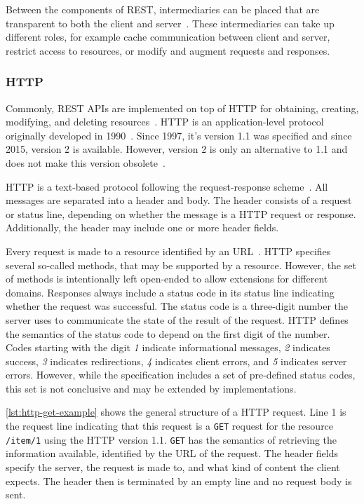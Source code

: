 Between the components of \ac{REST}, intermediaries can be placed that are transparent to both the client and server~\cite{Fielding2000}.
These intermediaries can take up different roles, for example cache communication between client and server, restrict access to resources, or modify and augment requests and responses.

\subsubsection{\acf{HTTP}}\label{sec:foundations:http}

Commonly, \ac{REST} \acp{API} are implemented on top of \ac{HTTP} for obtaining, creating, modifying, and deleting resources~\cite{Schermann2015}.
\ac{HTTP} is an application-level protocol originally developed in 1990~\cite{RFC2068}.
Since 1997, it's version 1.1 was specified and since 2015, version 2 is available.
However, version 2 is only an alternative to 1.1 and does not make this version obsolete~\cite{RFC7540}.

\ac{HTTP} is a text-based protocol following the request-response scheme~\cite{RFC2068}.
All messages are separated into a header and body.
The header consists of a request or status line, depending on whether the message is a \ac{HTTP} request or response.
Additionally, the header may include one or more header fields.

Every request is made to a resource identified by an \ac{URL}~\cite{RFC2068}.
\ac{HTTP} specifies several so-called methods, that may be supported by a resource.
However, the set of methods is intentionally left open-ended to allow extensions for different domains.
Responses always include a status code in its status line indicating whether the request was successful.
The status code is a three-digit number the server uses to communicate the state of the result of the request.
\ac{HTTP} defines the semantics of the status code to depend on the first digit of the number.
Codes starting with the digit \textit{1} indicate informational messages, \textit{2} indicates success, \textit{3} indicates redirections, \textit{4} indicates client errors, and \textit{5} indicates server errors.
However, while the specification includes a set of pre-defined status codes, this set is not conclusive and may be extended by implementations.

\autoref{lst:http-get-example} shows the general structure of a \ac{HTTP} request.
Line 1 is the request line indicating that this request is a \texttt{GET} request for the resource \texttt{/item/1} using the \ac{HTTP} version 1.1.
\texttt{GET} has the semantics of retrieving the information available, identified by the \ac{URL} of the request.
The header fields specify the server, the request is made to, and what kind of content the client expects.
The header then is terminated by an empty line and no request body is sent.

